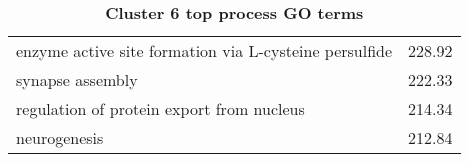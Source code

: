 \begin{table}[hp]
\begin{center}
\begin{tabular}{p{}r}
enzyme active site formation via L-cysteine persulfide                  & 228.92                      \\
synapse assembly                                                        & 222.33                      \\
regulation of protein export from nucleus                               & 214.34                      \\
neurogenesis                                                            & 212.84                      \\ \bottomrule
\end{tabular}
\end{center}

\caption[Cluster 6 top process GO terms]{\sf \textbf{Cluster 6 top process GO terms}}
\label{tab:cls6-process}
\end{table}